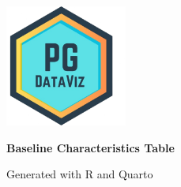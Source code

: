 \documentclass[
  12pt,
  letterpaper,
  DIV=11,
  numbers=noendperiod]{scrartcl}
\author{}
\date{}
\renewcommand*\contentsname{Table of contents}
\newcommand\contentsname{Table of contents}
\begin{document}
\renewcommand*\contentsname{Table of contents}
{
\hypersetup{linkcolor=}
\setcounter{tocdepth}{3}
\tableofcontents
}
\listoftables
\thispagestyle{empty}
\begin{center}
\vspace*{2cm}
\includegraphics[width=0.3\textwidth]{images/logo.png}

\vspace{1cm}
{\LARGE \textbf{Baseline Characteristics Table}}

\vspace{0.5cm}
{\large Generated with R and Quarto}

\vfill
\end{center}
\newpage

\newpage{}

\newpage
\end{document}
